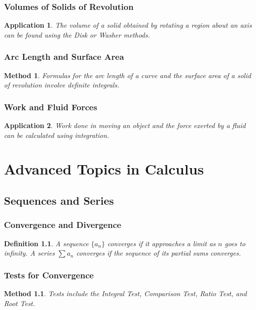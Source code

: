 \documentclass[a4paper,12pt]{book}
\newtheorem{application}{Application}
\newtheorem{definition}{Definition}
\newtheorem{method}{Method}
\begin{document}
\subsection{Volumes of Solids of Revolution}
\begin{application}
The volume of a solid obtained by rotating a region about an axis can be found using the Disk or Washer methods.
\end{application}

\subsection{Arc Length and Surface Area}
\begin{method}
Formulas for the arc length of a curve and the surface area of a solid of revolution involve definite integrals.
\end{method}

\subsection{Work and Fluid Forces}
\begin{application}
Work done in moving an object and the force exerted by a fluid can be calculated using integration.
\end{application}

\chapter{Advanced Topics in Calculus}
\section{Sequences and Series}
\subsection{Convergence and Divergence}
\begin{definition}
A sequence \( \{a_n\} \) converges if it approaches a limit as \( n \) goes to infinity. A series \( \sum a_n \) converges if the sequence of its partial sums converges.
\end{definition}

\subsection{Tests for Convergence}
\begin{method}
Tests include the Integral Test, Comparison Test, Ratio Test, and Root Test.
\end{method}
\end{document}
